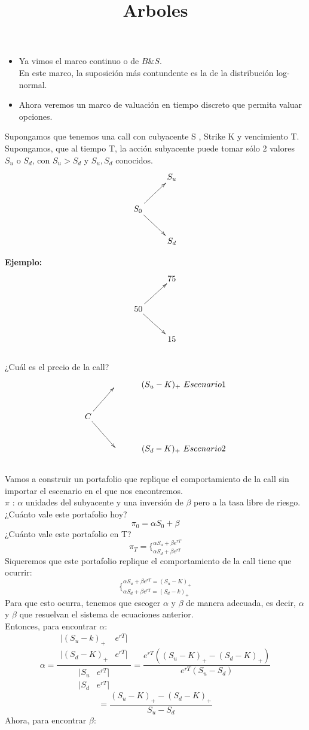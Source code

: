 \documentclass[12pts]{extarticle}
\author{}
\date{}
\title{Arboles}
\begin{document}
\maketitle 
\begin{itemize}
\item Ya vimos el marco continuo o de $B\& S$. \\ En este marco, la suposición más contundente es la de la distribución log-normal. 
\item Ahora veremos un marco de valuación en tiempo discreto que permita valuar opciones. 
\end{itemize}
Supongamos que tenemos una call con cubyacente S , Strike K y vencimiento T. \\ 
Supongamos, que al tiempo T, la acción subyacente puede tomar sólo 2 valores \textbf{$S_u$} o \textbf{$S_d$}, con $S_u>S_d$ y $S_u,  S_d$ conocidos. \\

$$\xymatrix{&S_u  \\ S_0 \ar[ru] \ar[rd] & \\ &S_d }$$ 

\textbf{Ejemplo:} 
$$\xymatrix{&75 \\ 50 \ar[ru] \ar[rd] & \\ &15}$$  
\\ ¿Cuál es el precio de la call? 
$$\xymatrix{& &(S_u-K)_+ \, \, Escenario 1 \\ C \ar[ru] \ar[rd] & & \\ & & (S_d-K)_+  \, \, Escenario 2}$$
\\ Vamos a construir un portafolio que replique el comportamiento de la call sin importar el escenario en el que nos encontremos. \\ 
$\pi$ : $\alpha$ unidades del subyacente y una inversión de $\beta$ pero a la tasa libre de riesgo. \\ 
¿Cuánto vale este portafolio hoy? $$\pi_0=\alpha S_0 + \beta$$ 
¿Cuánto vale este portafolio en T? 
$$\pi_T= \Bigg\{ _{\alpha S_d + \beta e^{rT}}^{\alpha S_u + \beta e^{rT}} $$ 
Siqueremos que este portafolio replique el comportamiento de la call tiene que ocurrir: 
$$ \Bigg\{ _{\alpha S_d + \beta e^{rT} = (S_d-k)_+}^{\alpha S_u+\beta e^{rT}=(S_u-K)_+} $$ 
Para que esto ocurra, tenemos que escoger $\alpha$ y $\beta$ de manera adecuada, es decir, $\alpha$ y $\beta$ que resuelvan el sistema de ecuaciones anterior. \\Entonces, para encontrar $\alpha$: 
$$\alpha=\frac{ \begin{matrix} 
                            |(S_u-k)_+ & e^{rT}| \\ |(S_d-K)_+ & e^{rT}|\end{matrix} }{\begin{matrix}
                                                                                                                          |S_u & e^{rT}| \\| S_d & e^{rT} |\end{matrix}}=\frac{e^{rT}((S_u-K)_+ -(S_d-K)_+)}{e^{rT}(S_u-S_d)}$$
$$=\frac{(S_u-K)_+ -(S_d-K)_+}{S_u-S_d}$$ 
Ahora, para encontrar $\beta$: 
\end{document}
